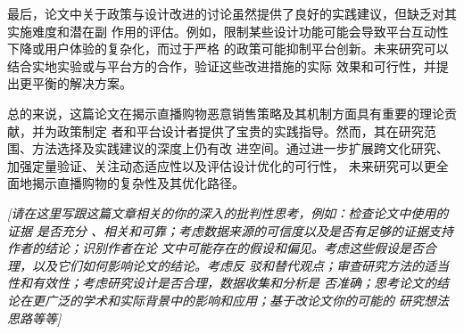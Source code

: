 \documentclass{article}
\begin{document}
最后，论文中关于政策与设计改进的讨论虽然提供了良好的实践建议，但缺乏对其实施难度和潜在副
作用的评估。例如，限制某些设计功能可能会导致平台互动性下降或用户体验的复杂化，而过于严格
的政策可能抑制平台创新。未来研究可以结合实地实验或与平台方的合作，验证这些改进措施的实际
效果和可行性，并提出更平衡的解决方案。

总的来说，这篇论文在揭示直播购物恶意销售策略及其机制方面具有重要的理论贡献，并为政策制定
者和平台设计者提供了宝贵的实践指导。然而，其在研究范围、方法选择及实践建议的深度上仍有改
进空间。通过进一步扩展跨文化研究、加强定量验证、关注动态适应性以及评估设计优化的可行性，
未来研究可以更全面地揭示直播购物的复杂性及其优化路径。

\newpage

\emph{{	[请在这里写跟这篇文章相关的你的深入的批判性思考，例如：检查论文中使用的证据
是否充分
	、相关和可靠；考虑数据来源的可信度以及是否有足够的证据支持作者的结论；识别作者在论
	文中可能存在的假设和偏见。考虑这些假设是否合理，以及它们如何影响论文的结论。考虑反
	驳和替代观点；审查研究方法的适当性和有效性；考虑研究设计是否合理，数据收集和分析是
	否准确；思考论文的结论在更广泛的学术和实际背景中的影响和应用；基于改论文你的可能的
	研究想法思路等等]}}
	
	
	
\end{document}

